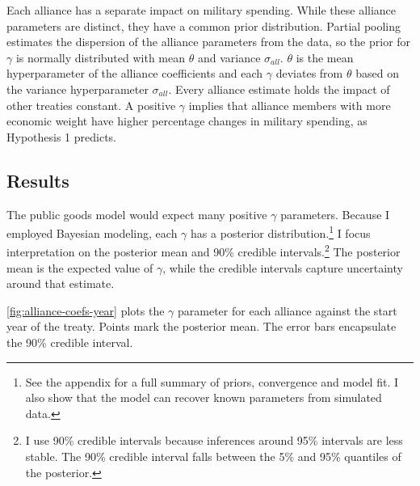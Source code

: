 \documentclass[12pt]{article}
\begin{document}
Each alliance has a separate impact on military spending.
While these alliance parameters are distinct, they have a common prior distribution.
Partial pooling estimates the dispersion of the alliance parameters from the data, so the prior for $\gamma$ is normally distributed with mean $\theta$ and variance $\sigma_{all}$. 
$\theta$ is the mean hyperparameter of the alliance coefficients and each $\gamma$ deviates from $\theta$ based on the variance hyperparameter $\sigma_{all}$.
Every alliance estimate holds the impact of other treaties constant. 
A positive $\gamma$ implies that alliance members with more economic weight have higher percentage changes in military spending, as Hypothesis 1 predicts. 
    


\subsection{Results} 


The public goods model would expect many positive $\gamma$ parameters. 
Because I employed Bayesian modeling, each $\gamma$ has a posterior distribution.\footnote{See the appendix for a full summary of priors, convergence and model fit. I also show that the model can recover known parameters from simulated data.} 
I focus interpretation on the posterior mean and 90\% credible intervals.\footnote{I use 90\% credible intervals because inferences around 95\% intervals are less stable. The 90\% credible interval falls between the 5\% and 95\% quantiles of the posterior.}
The posterior mean is the expected value of $\gamma$, while the credible intervals capture uncertainty around that estimate.  


\autoref{fig:alliance-coefs-year} plots the $\gamma$ parameter for each alliance against the start year of the treaty.
Points mark the posterior mean. 
The error bars encapsulate the 90\% credible interval.
\end{document}
